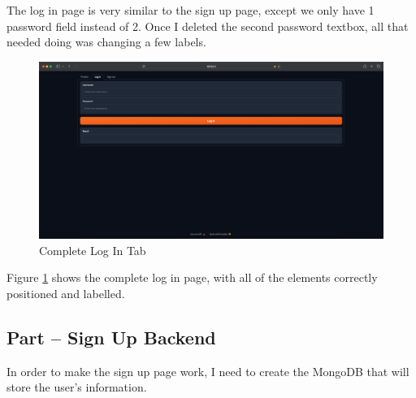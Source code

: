 \documentclass[12pt]{report}
\begin{document}
The log in page is very similar to the sign up page, except we only have 1 password field instead of 2. Once I deleted the second password textbox, all that needed doing was changing a few labels.

\begin{figure}[H]
\centering
\includegraphics[width=14cm]{ss14.6.png}
\caption{Complete Log In Tab}\label{fig:ss14.6}
\end{figure}

Figure \ref{fig:ss14.6} shows the complete log in page, with all of the elements correctly positioned and labelled.

\begin{center}
\end{center}

\subsection{Part \theparts{} -- Sign Up Backend}

In order to make the sign up page work, I need to create the MongoDB that will store the user's information.
\end{document}
